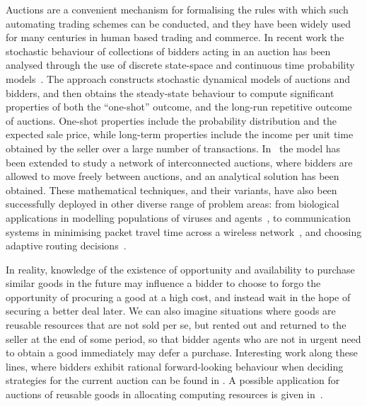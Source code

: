 \documentclass{comjnl}
\begin{document}
Auctions are a convenient mechanism for formalising the rules with
which such automating trading schemes can be conducted, and they
have been widely used for many centuries in human based trading
and commerce. In recent work the stochastic behaviour of
collections of bidders acting in an auction has been analysed
through the use of discrete state-space and continuous time
probability models~\cite{gelenbe06}. The approach constructs
stochastic dynamical models of auctions and bidders, and then
obtains the steady-state behaviour to compute significant
properties of both the ``one-shot'' outcome, and the long-run
repetitive outcome of auctions. One-shot properties include the
probability distribution and the expected sale price, while
long-term properties include the income per unit time obtained by
the seller over a large number of transactions.
In~\cite{gelenbe_inPress} the model has been extended to study a
network of interconnected auctions, where bidders are allowed to
move freely between auctions, and an analytical solution has been
obtained. These mathematical techniques, and their variants, have
also been successfully deployed in other diverse range of problem
areas: from biological applications in modelling populations of
viruses and agents~\cite{Gelenbe-SoftwareViruses}, to
communication systems in minimising packet travel time across a
wireless network~\cite{Gelenbe07_DiffModelPacketTravel,
Gelenbe_06_Workshop_TravelDelay}, and choosing adaptive routing
decisions~\cite{Gelenbe03_Sensible}.

In reality, knowledge of the existence of opportunity and
availability to purchase similar goods in the future may influence
a bidder to choose to forgo the opportunity of procuring a good at
a high cost, and instead wait in the hope of securing a better
deal later. We can also imagine situations where goods are
reusable resources that are not sold per se, but rented out and
returned to the seller at the end of some period, so that bidder
agents who are not in urgent need to obtain a good immediately may
defer a purchase. Interesting work along these lines, where
bidders exhibit rational forward-looking behaviour when deciding
strategies for the current auction can be found in
\cite{zeithammer06}. A possible application for auctions of
reusable goods in allocating computing resources is given
in~\cite{gagliano_etal_95}.
\end{document}
